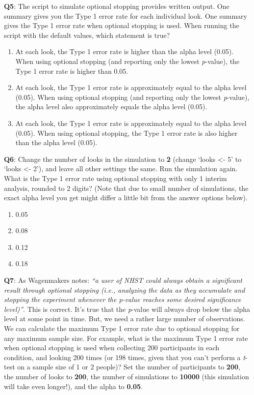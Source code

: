 \documentclass[
]{krantz}
\providecommand{\tightlist}{%
  \setlength{\itemsep}{0pt}\setlength{\parskip}{0pt}}
\begin{document}
\textbf{Q5}: The script to simulate optional stopping provides written output. One summary gives you the Type 1 error rate for each individual look. One summary gives the Type 1 error rate when optional stopping is used. When running the script with the default values, which statement is true?

\begin{enumerate}
\def\labelenumi{\Alph{enumi})}
\tightlist
\item
  At each look, the Type 1 error rate is higher than the alpha level (0.05).
  When using optional stopping (and reporting only the lowest \emph{p}-value), the Type 1 error rate is higher than 0.05.
\item
  At each look, the Type 1 error rate is approximately equal to the alpha level (0.05). When using optional stopping (and reporting only the lowest \emph{p}-value), the alpha level also approximately equals the alpha level (0.05).
\item
  At each look, the Type 1 error rate is approximately equal to the alpha level (0.05). When using optional stopping, the Type 1 error rate is also higher than the alpha level (0.05).
\end{enumerate}

\textbf{Q6}: Change the number of looks in the simulation to \textbf{2} (change `looks \textless- 5' to `looks \textless- 2'), and leave all other settings the same. Run the simulation again. What is the Type 1 error rate using optional stopping with only 1 interim analysis, rounded to 2 digits? (Note that due to small number of simulations, the exact alpha level you get might differ a little bit from the
answer options below).

\begin{enumerate}
\def\labelenumi{\Alph{enumi})}
\tightlist
\item
  0.05
\item
  0.08
\item
  0.12
\item
  0.18
\end{enumerate}

\textbf{Q7}: As Wagenmakers \citeyearpar{wagenmakers_practical_2007} notes: \emph{``a user of NHST could always obtain a significant result through optional stopping (i.e., analyzing the data as they accumulate and stopping the experiment whenever the p-value reaches some desired significance level)''}. This is correct. It's true that the \emph{p}-value will always drop below the alpha level at some point in time. But, we need a rather large number of observations. We can calculate the maximum Type 1 error rate due to optional stopping for any maximum sample size. For example, what is the maximum Type 1 error rate when optional stopping is used when collecting 200 participants in each condition, and looking 200 times (or 198 times, given that you can't perform a \emph{t}-test on a sample size of 1 or 2 people)? Set the number of participants to \textbf{200}, the number of looks to \textbf{200}, the number of simulations to \textbf{10000} (this simulation will take even longer!), and the alpha to \textbf{0.05}.
\end{document}
